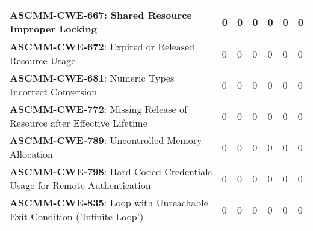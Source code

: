 \documentclass[openany,10pt,a4paper]{article}
\begin{document}
\begin{longtable}
\begin{table}[h]
\begin{tabular}{|p{3in}|p{0.3in}|p{0.3in}|p{0.3in}|p{0.3in}|p{0.3in}|p{0.4in}|}
		\textbf{ASCMM-CWE-667}: Shared Resource Improper Locking & 0 & 0 & 0 & 0 & 0 & 0 \\ \hline
		\textbf{ASCMM-CWE-672}: Expired or Released Resource Usage & 0 & 0 & 0 & 0 & 0 & 0 \\ \hline
		\textbf{ASCMM-CWE-681}: Numeric Types Incorrect Conversion & 0 & 0 & 0 & 0 & 0 & 0 \\ \hline
		\textbf{ASCMM-CWE-772}: Missing Release of Resource after Effective Lifetime & 0 & 0 & 0 & 0 & 0 & 0 \\ \hline
		\textbf{ASCMM-CWE-789}: Uncontrolled Memory Allocation & 0 & 0 & 0 & 0 & 0 & 0 \\ \hline
		\textbf{ASCMM-CWE-798}: Hard-Coded Credentials Usage for Remote Authentication & 0 & 0 & 0 & 0 & 0 & 0 \\ \hline
		\textbf{ASCMM-CWE-835}: Loop with Unreachable Exit Condition ('Infinite Loop') & 0 & 0 & 0 & 0 & 0 & 0 \\ \hline
	\end{tabular} 
	\label{tab:tabela1}
\end{table}



\end{longtable}
\end{document}
